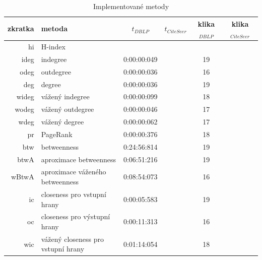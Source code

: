 \documentclass[12pt,titlepage]{report}
\begin{document}
\begin{table}[!ht]
\begin{center}
\begin{tabular}{r|l|c|c|c|c}
\toprule
zkratka & metoda & $t_{DBLP}$ & $t_{CiteSeer}$ & klika$_{DBLP}$\footnotemark & klika$_{CiteSeer}$\footnotemark \\
\midrule
hi    & H-index                            &             & &    & \\
ideg  & indegree                           & 0:00:00:049 & & 19 & \\
odeg  & outdegree                          & 0:00:00:036 & & 16 & \\
deg   & degree                             & 0:00:00:036 & & 19 & \\
wideg & vážený indegree                    & 0:00:00:099 & & 18 & \\
wodeg & vážený outdegree                   & 0:00:00:046 & & 17 & \\
wdeg  & vážený degree                      & 0:00:00:062 & & 17 & \\
pr    & PageRank                           & 0:00:00:376 & & 18 & \\
btw   & betweenness                        & 0:24:56:814 & & 19 & \\
btwA  & aproximace betweenness             & 0:06:51:216 & & 19 & \\
wBtwA & aproximace váženého betweenness    & 0:08:54:073 & & 16 & \\
ic    & closeness pro vstupní hrany        & 0:00:05:583 & & 19 & \\
oc    & closeness pro výstupní hrany       & 0:00:11:313 & & 16 & \\
wic   & vážený closeness pro vstupní hrany & 0:01:14:054 & & 18 & \\
\bottomrule
\end{tabular}
\end{center}
\caption{Implementované metody}
\label{tab:impmetody}
\end{table}


\end{document}
